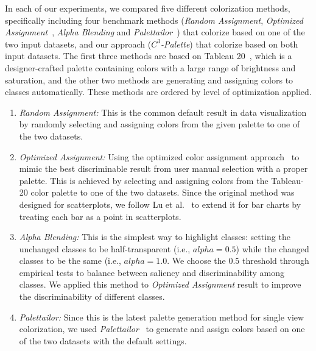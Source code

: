 \vspace{.3em}
 In each of our experiments, we compared five different colorization methods, specifically including four benchmark methods (\emph{Random Assignment}, \emph{Optimized Assignment}~\cite{Wang2018}, \emph{Alpha Blending} and \emph{Palettailor}~\cite{Lu21}) that colorize based on one of the two input datasets, and our approach (\emph{$C^3$-Palette}) that colorize based on both input datasets. The first three methods are based on Tableau 20~\cite{tableau}, which is a designer-crafted palette containing colors with a large range of brightness and saturation, and the other two methods are generating and assigning colors to classes automatically. These methods are ordered by level of optimization applied.
\begin{enumerate}
     \item \emph{Random Assignment:} This is the common default result in data visualization by randomly selecting and assigning colors from the given palette to one of the two datasets.
     \item \emph{Optimized Assignment:} Using the optimized color assignment approach~\cite{Wang2018} to mimic the best discriminable result from user manual selection with a proper palette. This is achieved by selecting and assigning colors from the Tableau-20 color palette to one of the two datasets. Since the original method was designed for scatterplots,  we follow Lu et al.~\cite{Lu21} to extend it for bar charts by treating each bar as a point in scatterplots.
     \item \emph{Alpha Blending:} This is the simplest way to highlight classes: setting the unchanged classes to be half-transparent (i.e., $alpha=0.5$) while the changed classes to be the same (i.e., $alpha=1.0$. We choose the $0.5$ threshold through empirical tests to balance between saliency and discriminability among classes. We applied this method to \emph{Optimized Assignment} result to improve the discriminability of different classes.  %
     \item \emph{Palettailor:} Since this is the latest palette generation method for single view colorization, we used \emph{Palettailor}~\cite{Lu21} to generate and assign colors based on one of the two datasets with the default settings.

\end{enumerate}
